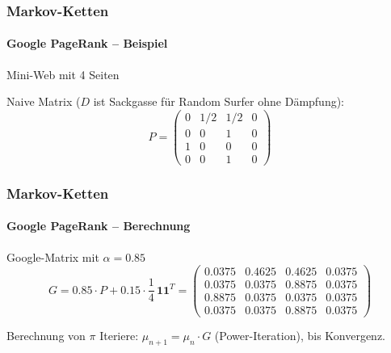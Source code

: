 \documentclass{beamer}
\newcommand{\one}{\bm{1}}
\begin{document}

\begin{frame}
    \frametitle{Markov-Ketten}
\framesubtitle{Google PageRank -- Beispiel}
    \begin{block}{Mini-Web mit 4 Seiten}
\end{block}
\vspace{-0.3cm}
\begin{center}
\end{center}
\vspace{-0.3cm}
Naive Matrix ($D$ ist Sackgasse für Random Surfer ohne Dämpfung):
\[
P = \begin{pmatrix} 0 & 1/2 & 1/2 & 0 \\ 0 & 0 & 1 & 0 \\ 1 & 0 & 0 & 0 \\ 0 & 0 & 1 & 0 \end{pmatrix}
\]
 \end{frame}



\begin{frame}
    \frametitle{Markov-Ketten}
\framesubtitle{Google PageRank -- Berechnung}
    \begin{block}{Google-Matrix mit $\alpha = 0.85$}
\[
G = 0.85 \cdot P + 0.15 \cdot \frac{1}{4} \, \one\one^{T}
 = \begin{pmatrix}
0.0375 & 0.4625 & 0.4625 & 0.0375 \\
0.0375 & 0.0375 & 0.8875 & 0.0375 \\
0.8875 & 0.0375 & 0.0375 & 0.0375 \\
0.0375 & 0.0375 & 0.8875 & 0.0375
\end{pmatrix}
\]
\end{block}
\begin{block}{Berechnung von $\pi$}
Iteriere: $\mu_{n+1} = \mu_n \cdot G$ (Power-Iteration), bis Konvergenz.
\end{block}
 \end{frame}
\end{document}
